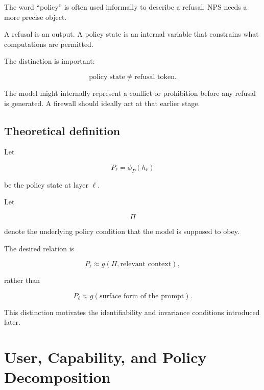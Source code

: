 \documentclass[11pt]{article}
\begin{document}
The word ``policy'' is often used informally to describe a refusal. NPS needs
a more precise object.

A refusal is an output. A policy state is an internal variable that
constrains what computations are permitted.

The distinction is important:

\begin{equation}
\text{policy state}
\neq
\text{refusal token}.
\end{equation}

The model might internally represent a conflict or prohibition before any
refusal is generated. A firewall should ideally act at that earlier stage.

\subsection*{Theoretical definition}

Let

\begin{equation}
P_\ell=\phi_P(h_\ell)
\end{equation}

be the policy state at layer $\ell$.

Let

\begin{equation}
\Pi
\end{equation}

denote the underlying policy condition that the model is supposed to obey.

The desired relation is

\begin{equation}
P_\ell
\approx
g(\Pi,\text{relevant context}),
\end{equation}

rather than

\begin{equation}
P_\ell
\approx
g(\text{surface form of the prompt}).
\end{equation}

This distinction motivates the identifiability and invariance conditions
introduced later.

\section{User, Capability, and Policy Decomposition}
\end{document}
